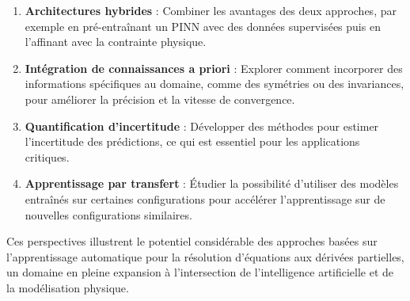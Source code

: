 \documentclass[11pt,a4paper]{article}
\begin{document}
\begin{enumerate}
    \item \textbf{Architectures hybrides} : Combiner les avantages des deux approches, par exemple en pré-entraînant un PINN avec des données supervisées puis en l'affinant avec la contrainte physique.

    \item \textbf{Intégration de connaissances a priori} : Explorer comment incorporer des informations spécifiques au domaine, comme des symétries ou des invariances, pour améliorer la précision et la vitesse de convergence.

    \item \textbf{Quantification d'incertitude} : Développer des méthodes pour estimer l'incertitude des prédictions, ce qui est essentiel pour les applications critiques.

    \item \textbf{Apprentissage par transfert} : Étudier la possibilité d'utiliser des modèles entraînés sur certaines configurations pour accélérer l'apprentissage sur de nouvelles configurations similaires.
\end{enumerate}

Ces perspectives illustrent le potentiel considérable des approches basées sur l'apprentissage automatique pour la résolution d'équations aux dérivées partielles, un domaine en pleine expansion à l'intersection de l'intelligence artificielle et de la modélisation physique.


\end{document}
